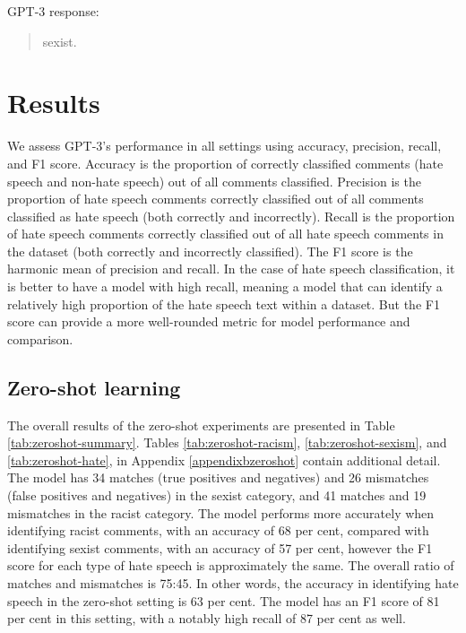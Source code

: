 \documentclass{bmcart}
\begin{document}
GPT-3 response:

\begin{quote}
sexist.
\end{quote}

\section{Results}\label{results}

We assess GPT-3's performance in all settings using accuracy, precision, recall, and F1 score. Accuracy is the proportion of correctly classified comments (hate speech and non-hate speech) out of all comments classified. Precision is the proportion of hate speech comments correctly classified out of all comments classified as hate speech (both correctly and incorrectly). Recall is the proportion of hate speech comments correctly classified out of all hate speech comments in the dataset (both correctly and incorrectly classified). The F1 score is the harmonic mean of precision and recall. In the case of hate speech classification, it is better to have a model with high recall, meaning a model that can identify a relatively high proportion of the hate speech text within a dataset. But the F1 score can provide a more well-rounded metric for model performance and comparison.

\subsection{Zero-shot learning}\label{zero-shot-learning-1}

The overall results of the zero-shot experiments are presented in Table \ref{tab:zeroshot-summary}. Tables \ref{tab:zeroshot-racism}, \ref{tab:zeroshot-sexism}, and \ref{tab:zeroshot-hate}, in Appendix \ref{appendixbzeroshot} contain additional detail. The model has 34 matches (true positives and negatives) and 26 mismatches (false positives and negatives) in the sexist category, and 41 matches and 19 mismatches in the racist category. The model performs more accurately when identifying racist comments, with an accuracy of 68 per cent, compared with identifying sexist comments, with an accuracy of 57 per cent, however the F1 score for each type of hate speech is approximately the same. The overall ratio of matches and mismatches is 75:45. In other words, the accuracy in identifying hate speech in the zero-shot setting is 63 per cent. The model has an F1 score of 81 per cent in this setting, with a notably high recall of 87 per cent as well.
\end{document}
